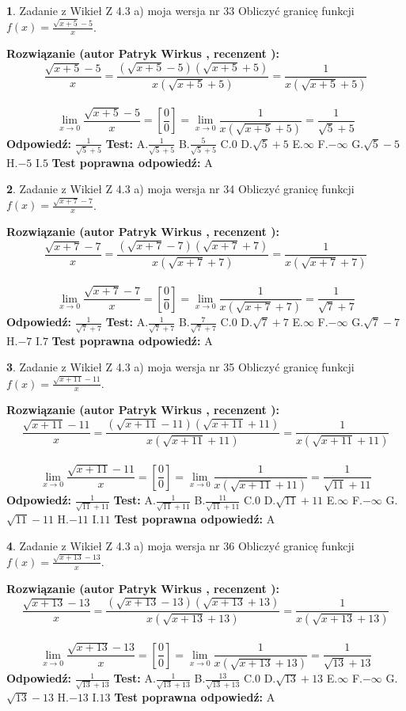\documentclass[12pt, a4paper]{article}
\theoremstyle{definition} %
\newtheorem{zad}{}
\newcommand{\zadStart}[1]{\begin{zad}#1\newline}
\newcommand{\zadStop}{\end{zad}}
\newcommand{\rozwStart}[2]{\noindent \textbf{Rozwiązanie (autor #1 , recenzent #2): }\newline}
\newcommand{\rozwStop}{\newline}
\newcommand{\odpStart}{\noindent \textbf{Odpowiedź:}\newline}
\newcommand{\odpStop}{\newline}
\newcommand{\testStart}{\noindent \textbf{Test:}\newline}
\newcommand{\testStop}{\newline}
\newcommand{\kluczStart}{\noindent \textbf{Test poprawna odpowiedź:}\newline}
\newcommand{\kluczStop}{\newline}
\begin{document}
\zadStart{Zadanie z Wikieł Z 4.3 a) moja wersja nr 33}
Obliczyć granicę funkcji $f(x)=\frac{\sqrt{x+5}-5}{x}$.
\zadStop
\rozwStart{Patryk Wirkus}{}
$$\frac{\sqrt{x+5}-5}{x}=\frac{(\sqrt{x+5}-5)(\sqrt{x+5}+5)}{x(\sqrt{x+5}+5)}=\frac{1}{x(\sqrt{x+5}+5)}$$
\\
$$\lim\limits_{x\to0}\frac{\sqrt{x+5}-5}{x}=[\frac{0}{0}]=
\lim\limits_{x\to0}\frac{1}{x(\sqrt{x+5}+5)} = \frac{1}{\sqrt{5}+5}$$
\rozwStop
\odpStart
$\frac{1}{\sqrt{5}+5}$
\odpStop
\testStart
A.$\frac{1}{\sqrt{5}+5}$
B.$\frac{5}{\sqrt{5}+5}$
C.$0$
D.$\sqrt{5}+5$
E.$\infty$
F.$-\infty$
G.$\sqrt{5}-5$
H.$-5$
I.$5$
\testStop
\kluczStart
A
\kluczStop



\zadStart{Zadanie z Wikieł Z 4.3 a) moja wersja nr 34}
Obliczyć granicę funkcji $f(x)=\frac{\sqrt{x+7}-7}{x}$.
\zadStop
\rozwStart{Patryk Wirkus}{}
$$\frac{\sqrt{x+7}-7}{x}=\frac{(\sqrt{x+7}-7)(\sqrt{x+7}+7)}{x(\sqrt{x+7}+7)}=\frac{1}{x(\sqrt{x+7}+7)}$$
\\
$$\lim\limits_{x\to0}\frac{\sqrt{x+7}-7}{x}=[\frac{0}{0}]=
\lim\limits_{x\to0}\frac{1}{x(\sqrt{x+7}+7)} = \frac{1}{\sqrt{7}+7}$$
\rozwStop
\odpStart
$\frac{1}{\sqrt{7}+7}$
\odpStop
\testStart
A.$\frac{1}{\sqrt{7}+7}$
B.$\frac{7}{\sqrt{7}+7}$
C.$0$
D.$\sqrt{7}+7$
E.$\infty$
F.$-\infty$
G.$\sqrt{7}-7$
H.$-7$
I.$7$
\testStop
\kluczStart
A
\kluczStop



\zadStart{Zadanie z Wikieł Z 4.3 a) moja wersja nr 35}
Obliczyć granicę funkcji $f(x)=\frac{\sqrt{x+11}-11}{x}$.
\zadStop
\rozwStart{Patryk Wirkus}{}
$$\frac{\sqrt{x+11}-11}{x}=\frac{(\sqrt{x+11}-11)(\sqrt{x+11}+11)}{x(\sqrt{x+11}+11)}=\frac{1}{x(\sqrt{x+11}+11)}$$
\\
$$\lim\limits_{x\to0}\frac{\sqrt{x+11}-11}{x}=[\frac{0}{0}]=
\lim\limits_{x\to0}\frac{1}{x(\sqrt{x+11}+11)} = \frac{1}{\sqrt{11}+11}$$
\rozwStop
\odpStart
$\frac{1}{\sqrt{11}+11}$
\odpStop
\testStart
A.$\frac{1}{\sqrt{11}+11}$
B.$\frac{11}{\sqrt{11}+11}$
C.$0$
D.$\sqrt{11}+11$
E.$\infty$
F.$-\infty$
G.$\sqrt{11}-11$
H.$-11$
I.$11$
\testStop
\kluczStart
A
\kluczStop



\zadStart{Zadanie z Wikieł Z 4.3 a) moja wersja nr 36}
Obliczyć granicę funkcji $f(x)=\frac{\sqrt{x+13}-13}{x}$.
\zadStop
\rozwStart{Patryk Wirkus}{}
$$\frac{\sqrt{x+13}-13}{x}=\frac{(\sqrt{x+13}-13)(\sqrt{x+13}+13)}{x(\sqrt{x+13}+13)}=\frac{1}{x(\sqrt{x+13}+13)}$$
\\
$$\lim\limits_{x\to0}\frac{\sqrt{x+13}-13}{x}=[\frac{0}{0}]=
\lim\limits_{x\to0}\frac{1}{x(\sqrt{x+13}+13)} = \frac{1}{\sqrt{13}+13}$$
\rozwStop
\odpStart
$\frac{1}{\sqrt{13}+13}$
\odpStop
\testStart
A.$\frac{1}{\sqrt{13}+13}$
B.$\frac{13}{\sqrt{13}+13}$
C.$0$
D.$\sqrt{13}+13$
E.$\infty$
F.$-\infty$
G.$\sqrt{13}-13$
H.$-13$
I.$13$
\testStop
\kluczStart
A
\kluczStop
\end{document}
